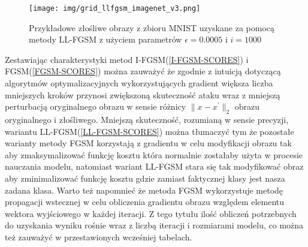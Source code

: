 \documentclass[
    left=2.5cm,         %
    right=2.5cm,        %
    top=2.5cm,          %
    bottom=3cm,         %
    bindingoffset=6mm,  %
    nohyphenation=false %
]{eiti/eiti-thesis}
\begin{document}
\pagebreak

\begin{figure}[H]
%

        \texttt{[image: img/grid\_llfgsm\_imagenet\_v3.png]}
        \caption{Przykładowe złośliwe obrazy z zbioru MNIST uzyskane za pomocą metody LL-FGSM z użyciem parametrów \(\epsilon=0.0005\) i \(i=1000\)}
        \label{fig:imagenet_grid_llfgsm}
%
%
\end{figure}

Zestawiając charakterystyki metod I-FGSM(\ref{I-FGSM-SCORES}) i FGSM(\ref{FGSM-SCORES}) można zauważyć że zgodnie z intuicją dotyczącą
algorytmów optymalizacyjnych wykorzystujących gradient większa liczba mniejszych kroków przynosi zwiększoną skuteczność ataku wraz
z mniejszą perturbacją oryginalnego obrazu w sensie różnicy \(\|x-x^{'}\|_2\) obrazu oryginalnego i złośliwego.
Mniejszą skuteczność, rozumianą w sensie precyzji, wariantu LL-FGSM(\ref{LL-FGSM-SCORES}) można tłumaczyć tym że pozostałe warianty
metody FGSM korzystają z gradientu w celu modyfikacji obrazu tak aby zmaksymalizować funkcję kosztu która normalnie zostałaby użyta w procesie nauczania modelu,
natomiast wariant LL-FGSM stara się tak modyfikować obraz aby zminimalizować funkcję kosztu gdzie zamiast faktycznej klasy jest nasza zadana klasa.
Warto też napomnieć że metoda FGSM wykorzystuje metodę propagacji wstecznej w celu obliczenia gradientu obrazu względem elementu wektora wyjściowego w każdej iteracji.
Z tego tytułu ilość obliczeń potrzebnych do uzyskania wyniku rośnie wraz z liczbą iteracji i rozmiarami modelu, co można też zauważyć w przestawionych wcześniej
tabelach.
\end{document}
